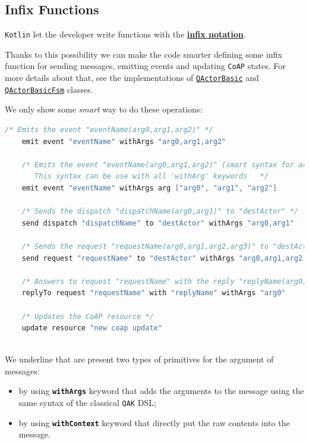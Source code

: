 \subsection{Infix Functions}

\texttt{Kotlin} let the developer write functions with the \href{https://kotlinlang.org/docs/functions.html#infix-notation}{\textbf{infix notation}}.

Thanks to this possibility we can make the code smarter defining some infix function for sending messages, emitting events and updating \texttt{CoAP} states. For more details about that, see the implementations of \href{https://github.com/LM-96/QA-Extensions/blob/main/it.unibo.qakactor/src/main/kotlin/QActorBasic.kt}{\texttt{QActorBasic}} and \href{https://github.com/LM-96/QA-Extensions/blob/main/it.unibo.qakactor/src/main/kotlin/QActorBasicFsm.kt}{\texttt{QActorBasicFsm}} classes.

We only show some \textit{smart} way to do these operations:
\begin{lstlisting}[language=kotlin, morekeywords={emit, event, withArgs, send, dispatch, request, replyTo, with, update, resource, arg}]
	/* Emits the event "eventName(arg0,arg1,arg2)" */
	emit event "eventName" withArgs "arg0,arg1,arg2"
	
	/* Emits the event "eventName(arg0,arg1,arg2)" (smart syntax for args)
	   This syntax can be use with all 'withArg' keywords	*/
	emit event "eventName" withArgs arg ["arg0", "arg1", "arg2"]
	
	/* Sends the dispatch "dispatchName(arg0,arg1)" to "destActor" */
	send dispatch "dispatchName" to "destActor" withArgs "arg0,arg1"
	
	/* Sends the request "requestName(arg0,arg1,arg2,arg3)" to "destActor" */
	send request "requestName" to "destActor" withArgs "arg0,arg1,arg2,arg3"
	
	/* Answers to request "requestName" with the reply "replyName(arg0)" */
	replyTo request "requestName" with "replyName" withArgs "arg0"
	
	/* Updates the CoAP resource */
	update resource "new coap update"
	
\end{lstlisting}
 
We underline that are present two types of primitives for the argument of messages:
\begin{itemize}
	\item by using \textbf{\texttt{withArgs}} keyword that adds the arguments to the message using the same syntax of the classical \texttt{QAK} DSL;
	\item by using \textbf{\texttt{withContext}} keyword that directly put the raw contents into the message. 
\end{itemize}

